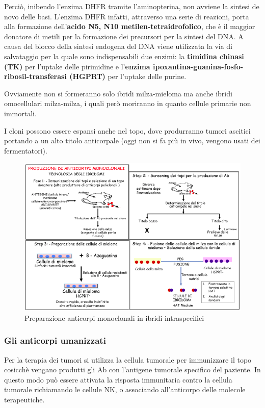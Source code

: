 \documentclass[11pt]{book}
\begin{document}
Perciò, inibendo l'enzima DHFR tramite l'aminopterina, non avviene la sintesi de novo delle basi. L’enzima DHFR infatti, attraverso una serie di reazioni, porta alla formazione dell’\textbf{acido N5, N10 metilen-tetraidrofolico}, che è il maggior donatore di metili per la formazione dei precursori per la sintesi del DNA. A causa del blocco della sintesi endogena del DNA viene utilizzata la via di salvataggio per la quale sono indispensabili due enzimi: la \textbf{timidina chinasi (TK)} per l’uptake delle pirimidine e l’\textbf{enzima ipoxantina-guanina-fosfo-ribosil-transferasi (HGPRT)} per l’uptake delle purine.

Ovviamente non si formeranno solo ibridi milza-mieloma ma anche ibridi omocellulari milza-milza, i quali però moriranno in quanto cellule primarie non immortali.

I cloni possono essere espansi anche nel topo, dove produrranno tumori ascitici portando a un alto titolo anticorpale (oggi non si fa più in vivo, vengono usati dei fermentatori).

\begin{figure}[h!]
\centering
\includegraphics[scale=0.65]{img/28_anticorpi_monoclonali.png}
\caption{Preparazione anticorpi monoclonali in ibridi intraspecifici}
\label{}
\end{figure}

\subsubsection{Gli anticorpi umanizzati}
Per la terapia dei tumori si utilizza la cellula tumorale per immunizzare il topo cosicchè vengano produtti gli Ab con l'antigene tumorale specifico del paziente. 
In questo modo può essere attivata la risposta immunitaria contro la cellula tumorale richiamando le cellule NK, o associando all’anticorpo delle molecole terapeutiche.
\end{document}
